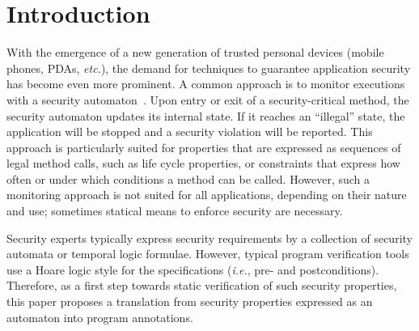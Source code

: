 \section{Introduction}\label{SecIntro}

With the emergence of a new generation of trusted personal devices
(mobile phones, PDAs, \emph{etc.}), the demand for
techniques to guarantee application security has become even more
prominent. A common approach is to monitor executions with a security
automaton~\cite{Schneider99}. Upon entry or exit of a
security-critical method, the security automaton updates its internal
state. If it reaches an ``illegal'' state, the application will be
stopped and a security violation will be reported. This approach is 
particularly suited for properties that are expressed as sequences of
legal method calls, such as life cycle properties, or constraints that
express how often or under which conditions a method can be called.
%
However, such a monitoring approach is not suited for all
applications, depending on their nature and use; sometimes statical
means to enforce security are necessary.


Security experts typically express security requirements by a collection of
security automata or temporal logic formulae. However, typical program
verification tools use a Hoare logic style for the specifications
(\emph{i.e.}, pre- and postconditions).
Therefore, as a first step towards static
verification of such security properties, this paper proposes a
translation from security properties expressed as an automaton 
into program annotations.

